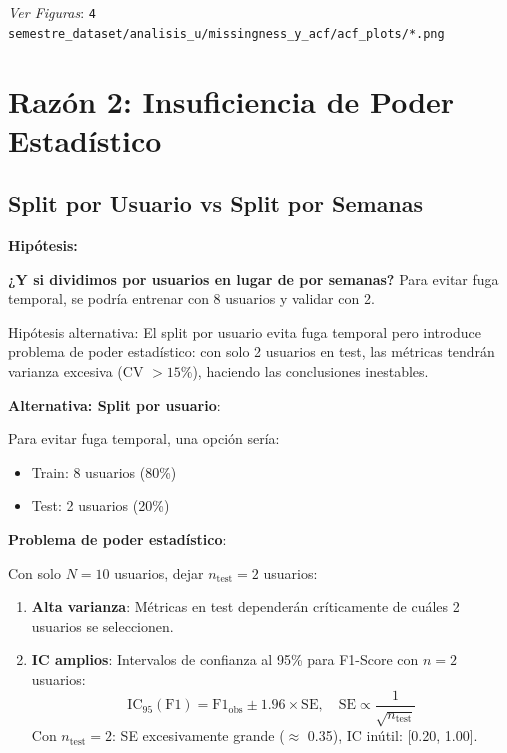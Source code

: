 \documentclass[12pt,letterpaper,twoside]{report}
\begin{document}
\begin{calculobox}
\textit{Ver Figuras}: \texttt{4 semestre\_dataset/analisis\_u/missingness\_y\_acf/acf\_plots/*.png}

\section{Razón 2: Insuficiencia de Poder Estadístico}

\subsection{Split por Usuario vs Split por Semanas}

\begin{hipotesisbox}
\textbf{Hipótesis:}

\textbf{¿Y si dividimos por usuarios en lugar de por semanas?} Para evitar fuga temporal, se podría entrenar con 8 usuarios y validar con 2.

Hipótesis alternativa: El split por usuario evita fuga temporal pero introduce problema de poder estadístico: con solo 2 usuarios en test, las métricas tendrán varianza excesiva (CV $> 15\%$), haciendo las conclusiones inestables.
\end{hipotesisbox}

\begin{estadisticobox}
\textbf{Alternativa: Split por usuario}:

Para evitar fuga temporal, una opción sería:
\begin{itemize}[noitemsep]
    \item Train: 8 usuarios (80\%)
    \item Test: 2 usuarios (20\%)
\end{itemize}

\textbf{Problema de poder estadístico}:

Con solo $N=10$ usuarios, dejar $n_{\text{test}}=2$ usuarios:

\begin{enumerate}[noitemsep]
    \item \textbf{Alta varianza}: Métricas en test dependerán críticamente de cuáles 2 usuarios se seleccionen.
    
    \item \textbf{IC amplios}: Intervalos de confianza al 95\% para F1-Score con $n=2$ usuarios:
    \begin{equation}
    \text{IC}_{95}(\text{F1}) = \text{F1}_{\text{obs}} \pm 1.96 \times \text{SE}, \quad \text{SE} \propto \frac{1}{\sqrt{n_{\text{test}}}}
    \end{equation}
    Con $n_{\text{test}}=2$: SE excesivamente grande ($\approx$ 0.35), IC inútil: [0.20, 1.00].
    

\end{enumerate}
\end{estadisticobox}
\end{calculobox}
\end{document}
